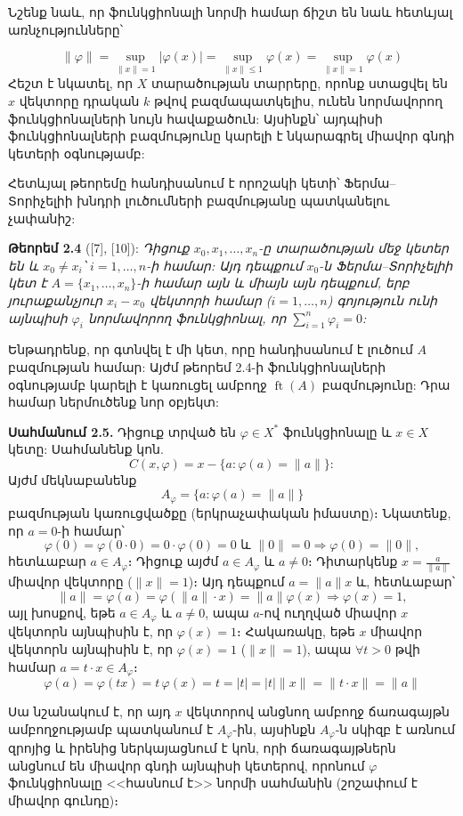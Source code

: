 \documentclass[12pt,a4paper]{article}
\numberwithin{equation}{section}
\numberwithin{figure}{section}
\begin{document}
Նշենք նաև, որ ֆունկցիոնալի նորմի համար ճիշտ են նաև հետևյալ առնչությունները՝

$$\|\varphi\| = \sup_{\|x\|=1} |\varphi(x)| = \sup_{\|x\| \leq 1} \varphi(x) = \sup_{\|x\|=1} \varphi(x)$$
Հեշտ է նկատել, որ $X$ տարածության տարրերը, որոնք ստացվել են $x$ վեկտորը դրական $k$ թվով բազմապատկելիս, ունեն նորմավորող ֆունկցիոնալների նույն հավաքածուն: Այսինքն՝ այդպիսի ֆունկցիոնալների բազմությունը կարելի է նկարագրել միավոր գնդի կետերի օգնությամբ:

Հետևյալ թեորեմը հանդիսանում է որոշակի կետի՝ Ֆերմա--Տորիչելիի խնդրի լուծումների բազմությանը պատկանելու չափանիշ:

\textbf{Թեորեմ 2.4} ([7], [10]): \textit{Դիցուք $x_0, x_1, \dots, x_n$-ը տարածության մեջ կետեր են և $x_0 \ne x_i$՝ $i = 1, \dots, n$-ի համար: Այդ դեպքում $x_0$-ն Ֆերմա--Տորիչելիի կետ է $A = \{x_1, \dots, x_n\}$-ի համար այն և միայն այն դեպքում, երբ յուրաքանչյուր $x_i - x_0$ վեկտորի համար ($i = 1, \dots, n$) գոյություն ունի այնպիսի $\varphi_i$ նորմավորող ֆունկցիոնալ, որ $\sum_{i=1}^n \varphi_i = 0$:}

Ենթադրենք, որ գտնվել է մի կետ, որը հանդիսանում է լուծում $A$ բազմության համար: Այժմ թեորեմ 2.4-ի ֆունկցիոնալների օգնությամբ կարելի է կառուցել ամբողջ $\operatorname{ft}(A)$ բազմությունը: Դրա համար ներմուծենք նոր օբյեկտ:

\textbf{Սահմանում 2.5.} Դիցուք տրված են $\varphi \in X^*$ ֆունկցիոնալը և $x \in X$ կետը: Սահմանենք կոն.
\begin{equation*}
    C(x, \varphi) = x - \{a : \varphi(a) = \|a\|\}:
\end{equation*}
Այժմ մեկնաբանենք 
$$A_\varphi = \{a : \varphi(a) = \|a\|\}$$
բազմության կառուցվածքը (երկրաչափական իմաստը)։
Նկատենք, որ $a = 0$-ի համար՝
$$\varphi(0) = \varphi(0 \cdot 0) = 0 \cdot \varphi(0) = 0 \text{ և } \|0\| = 0 \Rightarrow \varphi(0) = \|0\|,$$ հետևաբար $a \in A_\varphi$։
Դիցուք այժմ $a \in A_\varphi$ և $a \neq 0$։ Դիտարկենք $x = \frac{a}{\|a\|}$ միավոր վեկտորը ($\|x\| = 1$)։ Այդ դեպքում $a = \|a\|x$ և, հետևաբար՝
$$\|a\| = \varphi(a) = \varphi(\|a\| \cdot x) = \|a\| \varphi(x) \Rightarrow \varphi(x) = 1,$$
այլ խոսքով, եթե $a \in A_\varphi$ և $a \neq 0$, ապա $a$-ով ուղղված միավոր $x$ վեկտորն այնպիսին է, որ $\varphi(x) = 1$։ Հակառակը, եթե $x$ միավոր վեկտորն այնպիսին է, որ $\varphi(x) = 1$ ($\|x\| = 1$), ապա $\forall t > 0$ թվի համար $a = t \cdot x \in A_\varphi$։
$$\varphi(a) = \varphi(t x) = t \, \varphi(x) = t = |t| = |t| \|x\| = \|t \cdot x\| = \|a\|$$

Սա նշանակում է, որ այդ $x$ վեկտորով անցնող ամբողջ ճառագայթն ամբողջությամբ պատկանում է $A_\varphi$-ին, այսինքն $A_\varphi$-ն սկիզբ է առնում զրոյից և իրենից ներկայացնում է կոն, որի ճառագայթներն անցնում են միավոր գնդի այնպիսի կետերով, որոնում $\varphi$ ֆունկցիոնալը <<հասնում է>> նորմի սահմանին (շոշափում է միավոր գունդը)։
\end{document}

